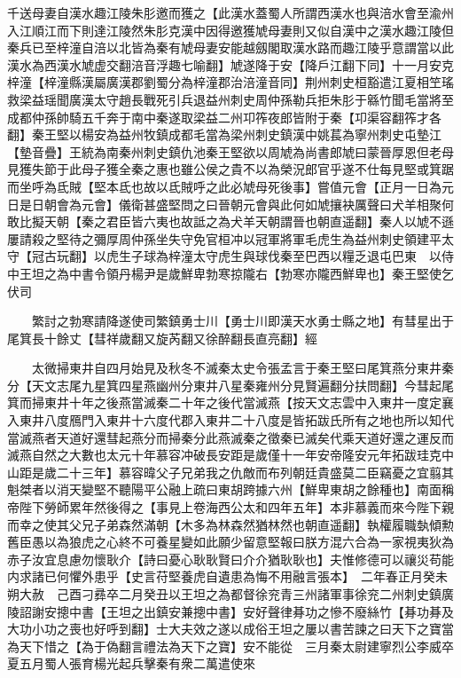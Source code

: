 千送母妻自漢水趣江陵朱肜邀而獲之【此漢水蓋蜀人所謂西漢水也與涪水會至渝州入江順江而下則達江陵然朱肜克漢中因得邀獲虓母妻則又似自漢中之漢水趣江陵但秦兵已至梓潼自涪以北皆為秦有虓母妻安能越劔閣取漢水路而趣江陵乎意謂當以此漢水為西漢水虓虚交翻涪音浮趣七喻翻】虓遂降于安【降戶江翻下同】十一月安克梓潼【梓潼縣漢屬廣漢郡劉蜀分為梓潼郡治涪潼音同】荆州刺史桓豁遣江夏相笁瑤救梁益瑶聞廣漢太守趙長戰死引兵退益州刺史周仲孫勒兵拒朱肜于緜竹聞毛當將至成都仲孫帥騎五千奔于南中秦遂取梁益二州卭筰夜郎皆附于秦【卭渠容翻筰才各翻】秦王堅以楊安為益州牧鎮成都毛當為梁州刺史鎮漢中姚萇為寧州刺史屯墊江【墊音疊】王統為南秦州刺史鎮仇池秦王堅欲以周虓為尚書郎虓曰蒙晉厚恩但老母見獲失節于此母子獲全秦之惠也雖公侯之貴不以為榮況郎官乎遂不仕每見堅或箕踞而坐呼為氐賊【堅本氐也故以氐賊呼之此必虓母死後事】嘗值元會【正月一日為元日是日朝會為元會】儀衛甚盛堅問之曰晉朝元會與此何如虓攘袂厲聲曰犬羊相聚何敢比擬天朝【秦之君臣皆六夷也故詆之為犬羊天朝謂晉也朝直遥翻】秦人以虓不遜屢請殺之堅待之彌厚周仲孫坐失守免官桓冲以冠軍將軍毛虎生為益州刺史領建平太守【冠古玩翻】以虎生子球為梓潼太守虎生與球伐秦至巴西以糧乏退屯巴東　以侍中王坦之為中書令領丹楊尹是歲鮮卑勃寒掠隴右【勃寒亦隴西鮮卑也】秦王堅使乞伏司

　　繁討之勃寒請降遂使司繁鎮勇士川【勇士川即漢天水勇士縣之地】有彗星出于尾箕長十餘丈【彗祥歲翻又旋芮翻又徐醉翻長直亮翻】經

　　太微掃東井自四月始見及秋冬不滅秦太史令張孟言于秦王堅曰尾箕燕分東井秦分【天文志尾九星箕四星燕幽州分東井八星秦雍州分見賢遍翻分扶問翻】今彗起尾箕而掃東井十年之後燕當滅秦二十年之後代當滅燕【按天文志雲中入東井一度定襄入東井八度鴈門入東井十六度代郡入東井二十八度是皆拓跋氏所有之地也所以知代當滅燕者天道好還彗起燕分而掃秦分此燕滅秦之徵秦已滅矣代乘天道好還之運反而滅燕自然之大數也太元十年慕容冲破長安距是歲僅十一年安帝隆安元年拓跋珪克中山距是歲二十三年】慕容暐父子兄弟我之仇敵而布列朝廷貴盛莫二臣竊憂之宜翦其魁桀者以消天變堅不聽陽平公融上疏曰東胡跨據六州【鮮卑東胡之餘種也】南面稱帝陛下勞師累年然後得之【事見上卷海西公太和四年五年】本非慕義而來今陛下親而幸之使其父兄子弟森然滿朝【木多為林森然猶林然也朝直遥翻】執權履職埶傾勲舊臣愚以為狼虎之心終不可養星變如此願少留意堅報曰朕方混六合為一家視夷狄為赤子汝宜息慮勿懷耿介【詩曰憂心耿耿賢曰介介猶耿耿也】夫惟修德可以禳災苟能内求諸已何懼外患乎【史言苻堅養虎自遺患為悔不用融言張本】　二年春正月癸未朔大赦　己酉刁彞卒二月癸丑以王坦之為都督徐兖青三州諸軍事徐兖二州刺史鎮廣陵詔謝安摠中書【王坦之出鎮安兼摠中書】安好聲律朞功之慘不廢絲竹【朞功朞及大功小功之喪也好呼到翻】士大夫效之遂以成俗王坦之屢以書苦諫之曰天下之寶當為天下惜之【為于偽翻言禮法為天下之寶】安不能從　三月秦太尉建寧烈公李威卒夏五月蜀人張育楊光起兵擊秦有衆二萬遣使來

